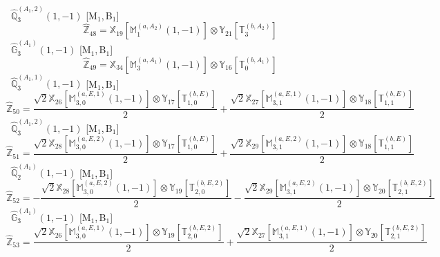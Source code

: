 \documentclass[fleqn,10pt,landscape]{article}
\begin{document}
\begin{itemize}
\begin{dmath*}
\end{dmath*}
\vspace{4mm}
\noindent {} $\,\,\,\hat{\mathbb{Q}}_{3}^{(A_{1},2)}(1,-1)$ [M$_{1}$,\,B$_{1}$]
\begin{dmath*}
\hat{\mathbb{Z}}_{48}=\mathbb{X}_{19}[\mathbb{M}_{1}^{(a,A_{2})}(1,-1)] \otimes\mathbb{Y}_{21}[\mathbb{T}_{3}^{(b,A_{2})}]
\end{dmath*}
\vspace{4mm}
\noindent {} $\,\,\,\hat{\mathbb{G}}_{3}^{(A_{1})}(1,-1)$ [M$_{1}$,\,B$_{1}$]
\begin{dmath*}
\hat{\mathbb{Z}}_{49}=\mathbb{X}_{34}[\mathbb{M}_{3}^{(a,A_{1})}(1,-1)] \otimes\mathbb{Y}_{16}[\mathbb{T}_{0}^{(b,A_{1})}]
\end{dmath*}
\vspace{4mm}
\noindent {} $\,\,\,\hat{\mathbb{Q}}_{3}^{(A_{1},1)}(1,-1)$ [M$_{1}$,\,B$_{1}$]
\begin{dmath*}
\hat{\mathbb{Z}}_{50}=\frac{\sqrt{2} \mathbb{X}_{26}[\mathbb{M}_{3,0}^{(a,E,1)}(1,-1)] \otimes\mathbb{Y}_{17}[\mathbb{T}_{1,0}^{(b,E)}]}{2} + \frac{\sqrt{2} \mathbb{X}_{27}[\mathbb{M}_{3,1}^{(a,E,1)}(1,-1)] \otimes\mathbb{Y}_{18}[\mathbb{T}_{1,1}^{(b,E)}]}{2}
\end{dmath*}
\vspace{4mm}
\noindent {} $\,\,\,\hat{\mathbb{Q}}_{3}^{(A_{1},2)}(1,-1)$ [M$_{1}$,\,B$_{1}$]
\begin{dmath*}
\hat{\mathbb{Z}}_{51}=\frac{\sqrt{2} \mathbb{X}_{28}[\mathbb{M}_{3,0}^{(a,E,2)}(1,-1)] \otimes\mathbb{Y}_{17}[\mathbb{T}_{1,0}^{(b,E)}]}{2} + \frac{\sqrt{2} \mathbb{X}_{29}[\mathbb{M}_{3,1}^{(a,E,2)}(1,-1)] \otimes\mathbb{Y}_{18}[\mathbb{T}_{1,1}^{(b,E)}]}{2}
\end{dmath*}
\vspace{4mm}
\noindent {} $\,\,\,\hat{\mathbb{Q}}_{2}^{(A_{1})}(1,-1)$ [M$_{1}$,\,B$_{1}$]
\begin{dmath*}
\hat{\mathbb{Z}}_{52}=- \frac{\sqrt{2} \mathbb{X}_{28}[\mathbb{M}_{3,0}^{(a,E,2)}(1,-1)] \otimes\mathbb{Y}_{19}[\mathbb{T}_{2,0}^{(b,E,2)}]}{2} - \frac{\sqrt{2} \mathbb{X}_{29}[\mathbb{M}_{3,1}^{(a,E,2)}(1,-1)] \otimes\mathbb{Y}_{20}[\mathbb{T}_{2,1}^{(b,E,2)}]}{2}
\end{dmath*}
\vspace{4mm}
\noindent {} $\,\,\,\hat{\mathbb{G}}_{3}^{(A_{1})}(1,-1)$ [M$_{1}$,\,B$_{1}$]
\begin{dmath*}
\hat{\mathbb{Z}}_{53}=\frac{\sqrt{2} \mathbb{X}_{26}[\mathbb{M}_{3,0}^{(a,E,1)}(1,-1)] \otimes\mathbb{Y}_{19}[\mathbb{T}_{2,0}^{(b,E,2)}]}{2} + \frac{\sqrt{2} \mathbb{X}_{27}[\mathbb{M}_{3,1}^{(a,E,1)}(1,-1)] \otimes\mathbb{Y}_{20}[\mathbb{T}_{2,1}^{(b,E,2)}]}{2}

\end{dmath*}
\end{itemize}
\end{document}
